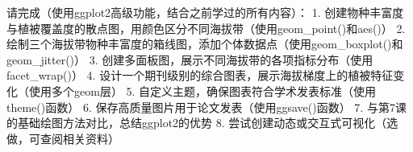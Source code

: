 \documentclass[
]{book}
\begin{document}
请完成（使用ggplot2高级功能，结合之前学过的所有内容）：
1. 创建物种丰富度与植被覆盖度的散点图，用颜色区分不同海拔带（使用geom\_point()和aes()）
2. 绘制三个海拔带物种丰富度的箱线图，添加个体数据点（使用geom\_boxplot()和geom\_jitter()）
3. 创建多面板图，展示不同海拔带的各项指标分布（使用facet\_wrap()）
4. 设计一个期刊级别的综合图表，展示海拔梯度上的植被特征变化（使用多个geom层）
5. 自定义主题，确保图表符合学术发表标准（使用theme()函数）
6. 保存高质量图片用于论文发表（使用ggsave()函数）
7. 与第7课的基础绘图方法对比，总结ggplot2的优势
8. 尝试创建动态或交互式可视化（选做，可查阅相关资料）

  
\end{document}
